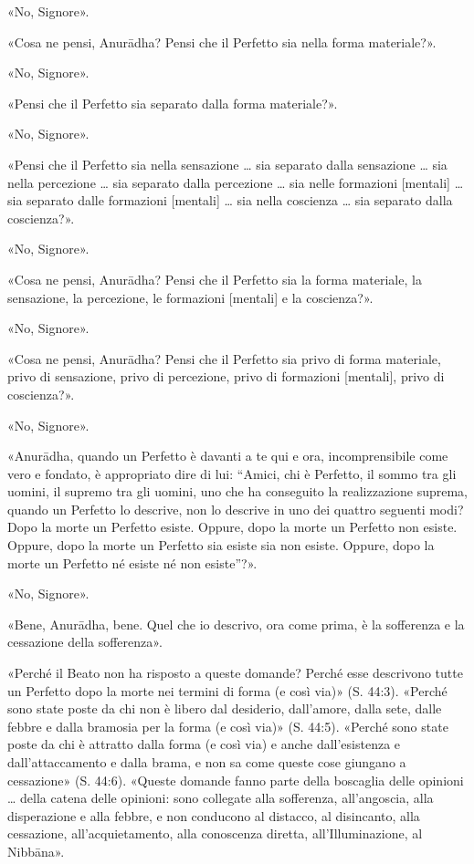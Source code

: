 «No, Signore».

«Cosa ne pensi, Anurādha? Pensi che il Perfetto sia nella forma materiale?».

«No, Signore».

«Pensi che il Perfetto sia separato dalla forma materiale?».

«No, Signore».

«Pensi che il Perfetto sia nella sensazione … sia separato dalla sensazione …
sia nella percezione … sia separato dalla percezione … sia nelle formazioni
[mentali] … sia separato dalle formazioni [mentali] … sia nella coscienza … sia
separato dalla coscienza?».

«No, Signore».

«Cosa ne pensi, Anurādha? Pensi che il Perfetto sia la forma materiale, la
sensazione, la percezione, le formazioni [mentali] e la coscienza?».

«No, Signore».

«Cosa ne pensi, Anurādha? Pensi che il Perfetto sia privo di forma materiale,
privo di sensazione, privo di percezione, privo di formazioni [mentali], privo
di coscienza?».

«No, Signore».

«Anurādha, quando un Perfetto è davanti a te qui e ora, incomprensibile come
vero e fondato, è appropriato dire di lui: “Amici, chi è Perfetto, il sommo tra
gli uomini, il supremo tra gli uomini, uno che ha conseguito la realizzazione
suprema, quando un Perfetto lo descrive, non lo descrive in uno dei quattro
seguenti modi? Dopo la morte un Perfetto esiste. Oppure, dopo la morte un
Perfetto non esiste. Oppure, dopo la morte un Perfetto sia esiste sia non
esiste. Oppure, dopo la morte un Perfetto né esiste né non esiste”?».

«No, Signore».

«Bene, Anurādha, bene. Quel che io descrivo, ora come prima, è la sofferenza e
la cessazione della sofferenza».


«Perché il Beato non ha risposto a queste domande? Perché esse descrivono tutte
un Perfetto dopo la morte nei termini di forma (e così via)» (S. 44:3). «Perché
sono state poste da chi non è libero dal desiderio, dall’amore, dalla sete,
dalle febbre e dalla bramosia per la forma (e così via)» (S. 44:5). «Perché sono
state poste da chi è attratto dalla forma (e così via) e anche dall’esistenza e
dall’attaccamento e dalla brama, e non sa come queste cose giungano a
cessazione» (S. 44:6). «Queste domande fanno parte della boscaglia delle
opinioni … della catena delle opinioni: sono collegate alla sofferenza,
all’angoscia, alla disperazione e alla febbre, e non conducono al distacco, al
disincanto, alla cessazione, all’acquietamento, alla conoscenza diretta,
all’Illuminazione, al Nibbāna».

